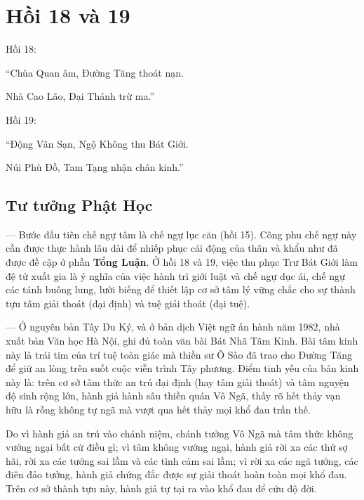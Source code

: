 \chapter{Hồi 18 và 19} %
\label{cha:hoi_18_19}

Hồi 18:

\begin{itshape}
``Chùa Quan âm, Đường Tăng thoát nạn.

Nhà Cao Lão, Đại Thánh trừ ma.''

\end{itshape}

Hồi 19:

\begin{itshape}
``Động Vân Sạn, Ngộ Không thu Bát Giới.

Núi Phù Đồ, Tam Tạng nhận chân kinh.''
\end{itshape}

\section{Tư tưởng Phật Học} %
\label{sec:18_19_phat_hoc}

— Bước đầu tiên chế ngự tâm là chế ngự lục căn (hồi 15). Công phu chế ngự này cần được thực hành lâu dài để nhiếp phục cái động của thân và khẩu như đã được đề cập ở phần {\bf Tổng Luận}. Ở hồi 18 và 19, việc thu phục Trư Bát Giới làm đệ tử xuất gia là ý nghĩa của việc hành trì giới luật và chế ngự dục ái, chế ngự các tánh buông lung, lười biếng để thiết lập cơ sở tâm lý vững chắc cho sự thành tựu tâm giải thoát (đại định) và tuệ giải thoát (đại tuệ).

— Ở nguyên bản Tây Du Ký, và ở bản dịch Việt ngữ ấn hành năm 1982, nhà xuất bản Văn học Hà Nội, ghi đủ toàn văn bài Bát Nhã Tâm Kinh. Bài tâm kinh này là trái tim của trí tuệ toàn giác mà thiền sư Ô Sào đã trao cho Đường Tăng để giữ an lòng trên suốt cuộc viễn trình Tây phương. Điểm tinh yếu của bản kinh này là: trên cơ sở tâm thức an trú đại định (hay tâm giải thoát) và tâm nguyện độ sinh rộng lớn, hành giả hành sâu thiền quán Vô Ngã, thấy rõ hết thảy vạn hữu là rỗng không tự ngã mà vượt qua hết thảy mọi khổ đau trần thế.

Do vì hành giả an trú vào chánh niệm, chánh tưởng Vô Ngã mà tâm thức không vướng ngại bất cứ điều gì; vì tâm không vướng ngại, hành giả rời xa các thứ sợ hãi, rời xa các tưởng sai lầm và các tình cảm sai lầm; vì rời xa các ngã tưởng, các điên đảo tưởng, hành giả chứng đắc được sự giải thoát hoàn toàn mọi khổ đau. Trên cơ sở thành tựu này, hành giả tự tại ra vào khổ đau để cứu độ đời.

